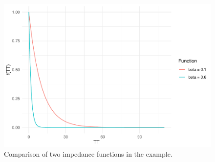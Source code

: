 \documentclass[]{elsarticle} %
\begin{document}
\begin{figure}
\includegraphics[width=1\linewidth]{Spatial-Availability-Refreshed_files/figure-latex/comparison-impedance-functions-synthetic-example-1} \caption{\label{fig:impedance-functions-comparison}Comparison of two impedance functions in the example.}\label{fig:comparison-impedance-functions-synthetic-example}
\end{figure}

 
  \providecommand{\huxb}[2]{\arrayrulecolor[RGB]{#1}\global\arrayrulewidth=#2pt}
  \providecommand{\huxvb}[2]{\color[RGB]{#1}\vrule width #2pt}
  \providecommand{\huxtpad}[1]{\rule{0pt}{#1}}
  \providecommand{\huxbpad}[1]{\rule[-#1]{0pt}{#1}}
\end{document}
